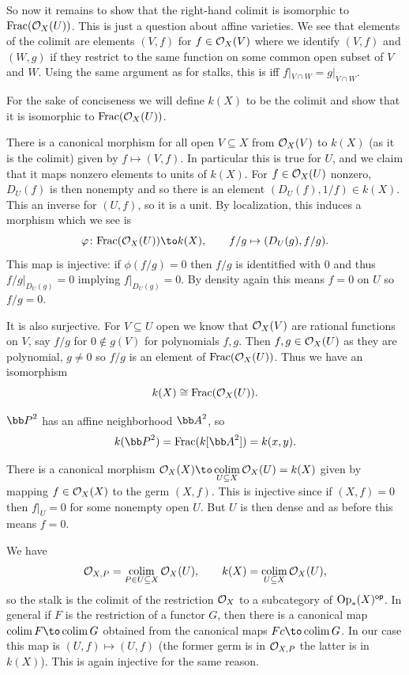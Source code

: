     So now it remains to show that the right-hand colimit is isomorphic to ${\rm Frac}({{\cal O}}_X(U))$.
    This is just a question about affine varieties.
    We see that elements of the colimit are elements $(V,f)$ for $f\in{{\cal O}}_X(V)$ where we identify $(V,f)$ and $(W,g)$ if they restrict to
    the same function on some common open subset of $V$ and $W$.
    Using the same argument as for stalks, this is iff $f|_{V\cap W}=g|_{V\cap W}$.

    For the sake of conciseness we will define $k(X)$ to be the colimit and show that it is isomorphic to ${\rm Frac}({{\cal O}}_X(U))$.

    There is a canonical morphism for all open $V\subseteq X$ from ${{\cal O}}_X(V)$ to $k(X)$ (as it is the colimit) given by $f\mapsto(V,f)$.
    In particular this is true for $U$, and we claim that it maps nonzero elements to units of $k(X)$.
    For $f\in{{\cal O}}_X(U)$ nonzero, $D_U(f)$ is then nonempty and so there is an element $(D_U(f),1/f)\in k(X)$.
    This an inverse for $(U,f)$, so it is a unit.
    By localization, this induces a morphism which we see is
    $$ \phi\colon\Frac(\O_X(U)) \to k(X),\qquad f/g\mapsto (D_U(g),f/g) . $$
    This map is injective: if $\phi(f/g)=0$ then $f/g$ is identitfied with $0$ and thus $f/g|_{D_U(g)}=0$ implying $f|_{D_U(g)}=0$.
    By density again this means $f=0$ on $U$ so $f/g=0$.

    It is also surjective.
    For $V\subseteq U$ open we know that ${{\cal O}}_X(V)$ are rational functions on $V$, say $f/g$ for $0\notin g(V)$ for polynomials $f,g$.
    Then $f,g\in{{\cal O}}_X(U)$ as they are polynomial, $g\neq0$ so $f/g$ is an element of ${\rm Frac}({{\cal O}}_X(U))$.
    Thus we have an isomorphism
    $$ k(X) \cong {\rm Frac}({{\cal O}}_X(U)) . $$

    \item $\bP^2$ has an affine neighborhood $\bA^2$, so
    $$ k(\bP^2) = \Frac(k[\bA^2]) = k(x,y) . $$

    \item There is a canonical morphism $\O_X(X)\to\colim_{U\subseteq X}\O_X(U)=k(X)$ given by mapping $f\in{{\cal O}}_X(X)$ to the germ $(X,f)$.
    This is injective since if $(X,f)=0$ then $f|_U=0$ for some nonempty open $U$.
    But $U$ is then dense and as before this means $f=0$.

    We have
    $$ {{\cal O}}_{X,P} = \mathop{\rm colim}\limits_{P\in U\subseteq X}{{\cal O}}_X(U),\qquad k(X) = \mathop{\rm colim}\limits_{U\subseteq X}{{\cal O}}_X(U) , $$
    so the stalk is the colimit of the restriction ${{\cal O}}_X$ to a subcategory of ${\rm Op}_*(X)^{\sf op}$.
    In general if $F$ is the restriction of a functor $G$, then there is a canonical map $\colim F\to\colim G$ obtained from the canonical maps
    $Fc\to\colim G$.
    In our case this map is $(U,f)\mapsto(U,f)$ (the former germ is in ${{\cal O}}_{X,P}$ the latter is in $k(X)$).
    This is again injective for the same reason.

